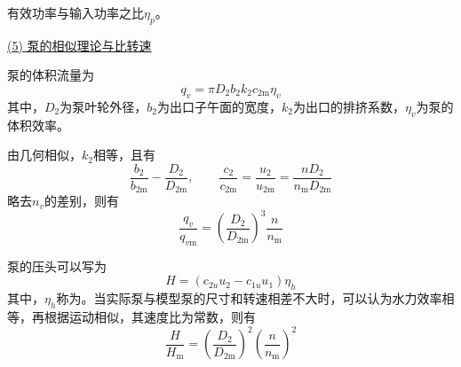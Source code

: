  \quad 有效功率与输入功率之比$\eta_p$。

\vspace*{1em}


\underline{(5) \hspace*{0.3em} 泵的相似理论与比转速}


\clearpage

\noindent \textbf{\blue[【流量关系】]}

泵的体积流量为
\begin{equation}
	q_v = \pi D_2 b_2 k_2 c_{2\text{m}}\eta_v
\end{equation}
其中，$D_2$为泵叶轮外径，$b_2$为出口子午面的宽度，$k_2$为出口的排挤系数，$\eta_v$为泵的体积效率。

由几何相似，$k_2$相等，且有
\begin{equation}
	\dfrac{b_2}{b_{2\text{m}}} - \dfrac{D_2}{D_{2\text{m}}}, \qquad \dfrac{c_2}{c_{2 \text{m}}} = \dfrac{u_2}{u_{2 \text{m}}} = \dfrac{nD_2}{n_{\text{m}} D_{2 \text{m}}}
\end{equation}
略去$n_v$的差别，则有
\begin{equation}
	\dfrac{q_v}{q_{v\text{m}}} = \left(\dfrac{D_2}{D_{2 \text{m}}}\right)^3 \dfrac{n}{n_{\text{m}}}
\end{equation}
\vspace*{0.5em}

\noindent \textbf{\blue[【压头关系】]}
泵的压头可以写为
\begin{equation}
	H = (c_{2u}u_2 - c_{1u}u_1)\eta_h
\end{equation}
其中，$\eta_h$称为。当实际泵与模型泵的尺寸和转速相差不大时，可以认为水力效率相等，再根据运动相似，其速度比为常数，则有
\begin{equation}
	\dfrac{H}{H_\text{m}} = \left(\dfrac{D_2}{D_{2\text{m}}}\right)^2 \left(\dfrac{n}{n_\text{m}}\right)^2
\end{equation}
\vspace*{0.5em}

